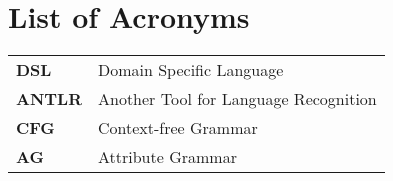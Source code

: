 \chapter*{List of Acronyms}

\begin{tabular}{ll}

\textbf{DSL}   & Domain Specific Language\\[0.1cm]
\textbf{ANTLR} & Another Tool for Language Recognition\\[0.1cm]
\textbf{CFG}   & Context-free Grammar\\[0.1cm]
\textbf{AG}    & Attribute Grammar\\[0.1cm]

\end{tabular}
